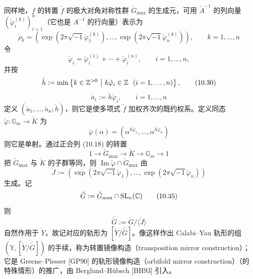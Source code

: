 同样地，$f$ 的转置 $\check f$ 的极大对角对称性群 $\check G_{\max}$ 的生成元，可用 $\check A^{-1}$ 的列向量 $(\check\varphi_i^{(k)})_{i=1}^{n}$（它也是 $A^{-1}$ 的行向量）表示为
\begin{equation}
    \check\rho_k=\left(\exp\left(2\pi\sqrt{-1}\check\varphi_1^{(k)}\right),\ldots,\exp\left(2\pi\sqrt{-1}\check\varphi_n^{(k)}\right)\right),\qquad k=1,\ldots,n \tag{10.28}
\end{equation}
令
\begin{equation}
    \check\varphi_i=\check\varphi_i^{(1)}+\cdots+\check\varphi_i^{(n)},\qquad i=1,\ldots,n, \tag{10.29}
\end{equation}
并按
\begin{equation}
    \check h:=\min\left\{k\in\Z^{>0}\ \middle|\ k\check\varphi_i\in\Z\ \ (i=1,\ldots,n)\right\}, \tag{10.30}
\end{equation}
\begin{equation}
    \check a_i:=\check h\check\varphi_i,\qquad i=1,\ldots,n \tag{10.31}
\end{equation}
定义 $(\check a_1,\ldots,\check a_n;\check h)$，则它是使多项式 $\check f$ 加权齐次的既约权系。定义同态 $\check\varphi\colon\mathbb{G}_m\to\check K$ 为
\begin{equation}
    \check\varphi(\alpha)=\left(\alpha^{h\check\varphi_1},\ldots,\alpha^{h\check\varphi_n}\right) \tag{10.32}
\end{equation}
则它是单射。通过正合列 (10.18) 的转置
\begin{equation}
    1\to\check G_{\max}\to\check K\to\mathbb{G}_m\to 1 \tag{10.33}
\end{equation}
把 $\check G_{\max}$ 与 $\check K$ 的子群等同，则 $\operatorname{Im}\check\varphi\cap\check G_{\max}$ 由
\begin{equation}
    \check J:=\left(\exp\left(2\pi\sqrt{-1}\check\varphi_1\right),\ldots,\exp\left(2\pi\sqrt{-1}\check\varphi_n\right)\right) \tag{10.34}
\end{equation}
生成。记
\begin{equation}
    \check G:=\check G_{\max}\cap\mathrm{SL}_n(\mathbb{C}) \tag{10.35}
\end{equation}
则
\begin{equation}
    \overline{\check G}:=\check G/\langle\check J\rangle \tag{10.36}
\end{equation}
自然作用于 $\check Y$，故记对应的轨形为 $[\check Y/\overline{\check G}]$。像这样作出 Calabi–Yau 轨形的组 $(\mathbb{Y},[\check Y/\overline{\check G}])$ 的手续，称为转置镜像构造（transposition mirror construction）；它是 Greene–Plesser [GP90] 的轨形镜像构造（orbifold mirror construction）（的特殊情形）的推广，由 Berglund–Hübsch [BH93] 引入。

